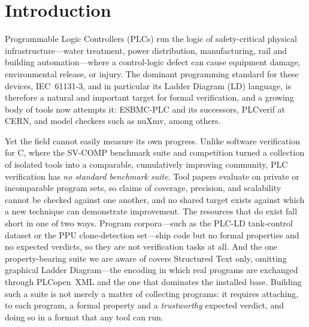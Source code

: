 
\section{Introduction}
\label{sec:intro}

Programmable Logic Controllers (PLCs) run the logic of safety-critical physical
infrastructure---water treatment, power distribution, manufacturing, rail and building
automation---where a control-logic defect can cause equipment damage, environmental
release, or injury. The dominant programming standard for these devices, IEC~61131-3,
and in particular its Ladder Diagram (LD) language, is therefore a natural and important
target for formal verification, and a growing body of tools now attempts it: ESBMC-PLC and
its successors, PLCverif at CERN, and model checkers such as nuXmv, among others.

Yet the field cannot easily measure its own progress. Unlike software verification for C,
where the SV-COMP benchmark suite and competition turned a collection of isolated tools into
a comparable, cumulatively improving community, PLC verification has \emph{no standard
benchmark suite}. Tool papers evaluate on private or incomparable program sets, so claims of
coverage, precision, and scalability cannot be checked against one another, and no shared
target exists against which a new technique can demonstrate improvement. The resources that
do exist fall short in one of two ways. Program corpora---such as the PLC-LD tank-control
dataset or the PPU clone-detection set---ship code but no formal properties and no expected
verdicts, so they are not verification tasks at all. And the one property-bearing suite we
are aware of covers Structured Text only, omitting graphical Ladder Diagram---the encoding
in which real programs are exchanged through PLCopen~XML and the one that dominates the
installed base. Building such a suite is not merely a matter of collecting programs: it
requires attaching, to each program, a formal property and a \emph{trustworthy} expected
verdict, and doing so in a format that any tool can run.

